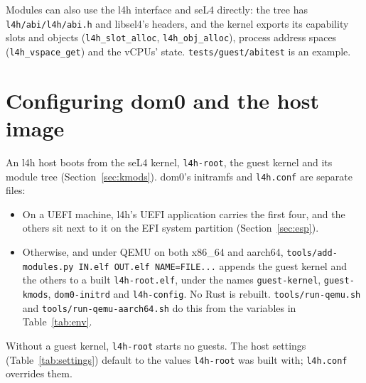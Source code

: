 \documentclass[11pt,a4paper]{report}
\newcommand{\cmd}[1]{\texttt{#1}}
\newcommand{\file}[1]{\texttt{#1}}
\begin{document}
Modules can also use the l4h interface and seL4 directly: the tree has
\file{l4h/abi/l4h/abi.h} and libsel4's headers, and the kernel exports its
capability slots and objects (\texttt{l4h\_slot\_alloc},
\texttt{l4h\_obj\_alloc}), process address spaces
(\texttt{l4h\_vspace\_get}) and the vCPUs' state.
\file{tests/guest/abitest} is an example.

\chapter{Configuring dom0 and the host image}
\label{ch:dom0}

An l4h host boots from the seL4 kernel, \texttt{l4h-root}, the guest
kernel and its module tree (Section~\ref{sec:kmods}). dom0's initramfs and
\file{l4h.conf} are separate files:
\begin{itemize}
  \item On a UEFI machine, l4h's UEFI application carries the first four,
        and the others sit next to it on the EFI system partition
        (Section~\ref{sec:esp}).
  \item Otherwise, and under QEMU on both x86\_64 and aarch64,
        \cmd{tools/add-modules.py IN.elf OUT.elf NAME=FILE...} appends
        the guest kernel and the others to a built \file{l4h-root.elf},
        under the names \texttt{guest-kernel}, \texttt{guest-kmods},
        \texttt{dom0-initrd} and \texttt{l4h-config}. No Rust is rebuilt.
        \cmd{tools/run-qemu.sh} and \cmd{tools/run-qemu-aarch64.sh} do
        this from the variables in Table~\ref{tab:env}.
\end{itemize}
Without a guest kernel, \texttt{l4h-root} starts no guests.
The host settings (Table~\ref{tab:settings}) default to the values
\texttt{l4h-root} was built with; \file{l4h.conf} overrides them.
\end{document}
